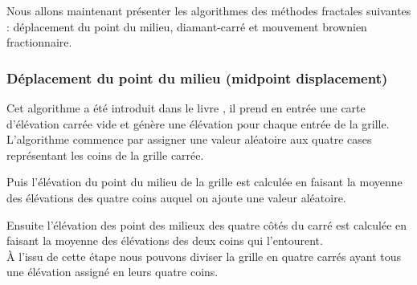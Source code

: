 
Nous allons maintenant présenter les algorithmes des méthodes fractales suivantes : déplacement du point du milieu, diamant-carré et mouvement brownien fractionnaire.

\subsubsection{Déplacement du point du milieu (midpoint displacement)}
Cet algorithme a été introduit dans le livre \cite{Four82}, il prend en entrée
une carte d'élévation carrée vide et génère une élévation
pour chaque entrée de la grille.\\

L'algorithme commence par assigner une valeur aléatoire aux quatre cases
représentant les coins de la grille carrée.

Puis l'élévation du point du milieu de la grille est calculée en faisant
la moyenne des élévations des quatre coins auquel on ajoute une valeur
aléatoire.

Ensuite l'élévation des point des milieux des quatre côtés du carré est calculée
en faisant la moyenne des élévations des deux coins qui l'entourent.
\\

\`A l'issu de cette étape nous pouvons diviser la grille en quatre carrés
ayant tous une élévation assigné en leurs quatre coins.\\

